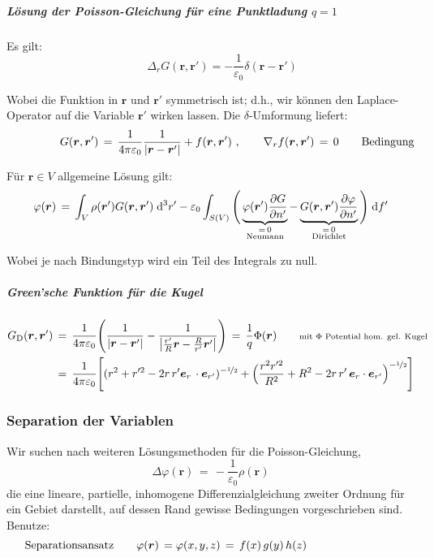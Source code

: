\documentclass[titlepage,11pt,a4paper,ngerman]{report}
\newcommand{\dd}{\mathrm{d}}
\renewcommand{\vec}[1]{\bm{#1}}
\renewcommand{\epsilon}{\varepsilon}
\renewcommand{\paragraph}[1]{\subsubsection{#1}}
\newcommand{\eq}{\,=\,}
\begin{document}
\subparagraph{Lösung der Poisson-Gleichung für eine Punktladung $q = 1$} Es gilt:
\[\qquad \Delta_r G(\vec{r},\vec{r}')=-\frac{1}{\epsilon_0}\delta(\vec{r}-\vec{r}')\]

Wobei die Funktion in $\vec{r}$ und $\vec{r}'$ symmetrisch ist; d.h., wir können den Laplace-Operator auf die Variable $\vec{r}'$ wirken lassen. Die $\delta$-Umformung liefert:
\[G(\vec{r},\vec{r}')\,=\,\frac{1}{4\pi\epsilon_0}\frac{1}{\left|\vec{r}-\vec{r}'\right|}+f(\vec{r},\vec{r}')\ ,\qquad \nabla_r f(\vec{r},\vec{r}')\,=\,0\qquad\rlap{Bedingung}\]

Für $\vec{r}\in V$ allgemeine Lösung gilt:
\[\varphi(\vec{r})\,=\,\int_V\rho(\vec{r}')G(\vec{r},\vec{r}')\;\dd^3r'-\epsilon_0\int_{S(V)}\Bigg(\underbrace{\varphi(\vec{r}')\frac{\partial G}{\partial n'}}_{\mathclap{\substack{{=\,0}\\{\text{Neumann}}}}}-\underbrace{G(\vec{r},\vec{r}')\frac{\partial\varphi}{\partial n'}}_{\mathclap{\substack{{=\,0}\\{\text{Dirichlet}}}}}\Bigg)\;\dd f'\]

Wobei je nach Bindungstyp wird ein Teil des Integrals zu null.

\subparagraph{Green'sche Funktion für die Kugel}
\begin{align*}
G_\mathrm{D}(\vec{r},\vec{r}')\,&=\,\frac{1}{4\pi\epsilon_0}\Bigg(\frac{1}{\left|\vec{r}-\vec{r}'\right|}-\frac{1}{\left|\frac{r'}{R}\vec{r}-\frac{R}{r'}\vec{r}'\right|}\Bigg)\eq \frac{1}{q}\Phi(\vec{r})\qquad\rlap{\scriptsize{mit $\Phi$ Potential hom. gel. Kugel}}\\
&=\,\frac{1}{4\pi\epsilon_0}\Bigg[ (r^2+r'^2-2r\,r'\vec{e}_r\,\cdot\vec{e}_{r'})^{-\nicefrac{1}{2}}+\Big( \frac{r^2r'^2}{R^2}+R^2-2r\,r'\,\vec{e}_r\cdot\vec{e}_{r'} \Big)^{-\nicefrac{1}{2}} \Bigg]
\end{align*}

\paragraph{Separation der Variablen}
Wir suchen nach weiteren Lösungsmethoden für die Poisson-Gleichung,
\[\Delta\varphi(\vec{r})\,=\,-\frac{1}{\epsilon_0}\rho(\vec{r})\]
die eine lineare, partielle, inhomogene Differenzialgleichung zweiter Ordnung für ein Gebiet darstellt, auf dessen Rand gewisse Bedingungen vorgeschrieben sind. Benutze:
\hfill\break
\[\llap{Separationsansatz}\qquad\varphi(\vec{r})\,=\varphi(x,y,z)\,=\,f(x)\,g(y)\,h(z)\]

\pagebreak
\end{document}
